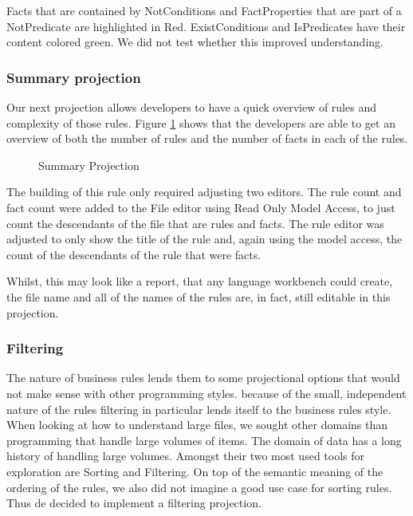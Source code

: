 Facts that are contained by NotConditions and FactProperties that are part of a NotPredicate are highlighted in Red.
ExistConditions and IsPredicates have their content colored green.
We did not test whether this improved understanding.

\subsubsection{Summary projection}
Our next projection allows developers to have a quick overview of rules and complexity of those rules.
Figure \ref{fig:summaryProjection} shows that the developers are able to get an overview of both the number of rules and the number of facts in each of the rules.

\begin{figure}[h]
    \centering
    \caption{Summary Projection}
    \label{fig:summaryProjection}
\end{figure}

The building of this rule only required adjusting two editors.
The rule count and fact count were added to the File editor using Read Only Model Access, to just count the descendants of the file that are rules and facts.
The rule editor was adjusted to only show the title of the rule and, again using the model access, the count of the descendants of the rule that were facts.

Whilst, this may look like a report, that any language workbench could create, the file name and all of the names of the rules are, in fact, still editable in this projection.

\subsubsection{Filtering}
The nature of business rules lends them to some projectional options that would not make sense with other programming styles.
because of the small, independent nature of the rules filtering in particular lends itself to the business rules style.
When looking at how to understand large files, we sought other domains than programming that handle large volumes of items.
The domain of data has a long history of handling large volumes.
Amongst their two most used tools for exploration are Sorting and Filtering.
On top of the semantic meaning of the ordering of the rules, we also did not imagine a good use case for sorting rules.
Thus de decided to implement a filtering projection.

